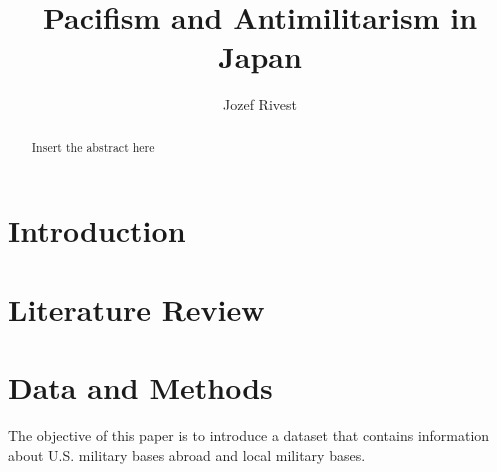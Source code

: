 \documentclass{article}
\title{Pacifism and Antimilitarism in Japan}
\author{Jozef Rivest}
\date{ }
\begin{document}
\maketitle

\begin{abstract}
  Insert the abstract here
\end{abstract}

\section{Introduction}


\section{Literature Review}


\section{Data and Methods}

The objective of this paper is to introduce a dataset that contains 
information about U.S. military bases abroad and local military bases. 
\end{document}
